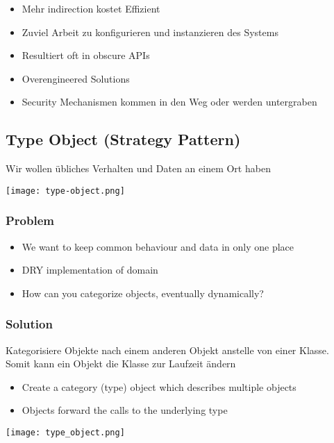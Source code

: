 \begin{itemize}
    \item Mehr indirection kostet Effizient
    \item Zuviel Arbeit zu konfigurieren und instanzieren des Systems
    \item Resultiert oft in obscure APIs
    \item Overengineered Solutions
    \item Security Mechanismen kommen in den Weg oder werden untergraben
\end{itemize}

\subsection{Type Object (Strategy Pattern)}

Wir wollen übliches Verhalten und Daten an einem Ort haben

\texttt{[image: type-object.png]}

\subsubsection{Problem}
\begin{itemize}
    \item We want to keep common behaviour and data in only one place
    \item DRY implementation of domain
    \item How can you categorize objects, eventually dynamically?
\end{itemize}

\subsubsection{Solution}
Kategorisiere Objekte nach einem anderen Objekt anstelle von einer Klasse. Somit kann ein Objekt die Klasse zur Laufzeit ändern

\begin{itemize}
    \item Create a category (type) object which describes multiple objects
    \item Objects forward the calls to the underlying type
\end{itemize}
\texttt{[image: type\_object.png]}
